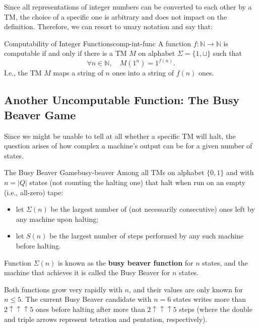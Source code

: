 Since all representations of integer numbers can be converted to each other by a TM, the choice of a specific one is arbitrary and does not impact on the definition. Therefore, we can resort to unary notation and say that:

\begin{theorem}{Computability of Integer Functions}{comp-int-func}
    A function \(f : \mathbb{N} \rightarrow \mathbb{N}\) is computable if and only if there is a TM \(M\) on alphabet \(\Sigma = \{1, \sqcup\}\) such that
    \[
    \forall n \in \mathbb{N}, \quad M(1^n) = 1^{f(n)}.
    \]
    I.e., the TM \(M\) maps a string of \(n\) ones into a string of \(f(n)\) ones.
\end{theorem}

\subsection{Another Uncomputable Function: The Busy Beaver Game}
Since we might be unable to tell at all whether a specific TM will halt, the question arises of how complex a machine's output can be for a given number of states.

\begin{definition}{The Busy Beaver Game}{busy-beaver}
    Among all TMs on alphabet \(\{0, 1\}\) and with \(n = |Q|\) states (not counting the halting one) that halt when run on an empty (i.e., all-zero) tape:
    \begin{itemize}
        \item let \(\Sigma(n)\) be the largest number of (not necessarily consecutive) ones left by any machine upon halting;
        \item let \(S(n)\) be the largest number of steps performed by any such machine before halting.
    \end{itemize}
    Function \(\Sigma(n)\) is known as the \textbf{busy beaver function} for \(n\) states, and the machine that achieves it is called the Busy Beaver for \(n\) states.
\end{definition}

\noindent Both functions grow very rapidly with \(n\), and their values are only known for \(n \le 5\). The current Busy Beaver candidate with \(n = 6\) states writes more than \(2 \uparrow\uparrow\uparrow 5\) ones before halting after more than \(2 \uparrow\uparrow\uparrow 5\) steps (where the double and triple arrows represent tetration and pentation, respectively).

